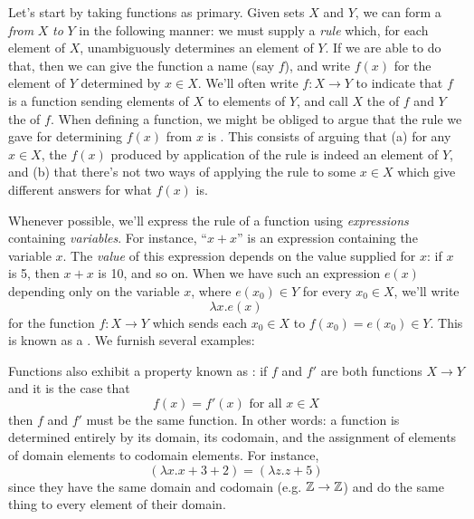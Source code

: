     Let's start by taking functions as primary. Given sets $X$ and $Y$, we can form a  \textit{from} $X$ \textit{to} $Y$ in the following manner: we must supply a \textit{rule} which, for each element of $X$, unambiguously determines an element of $Y$. If we are able to do that, then we can give the function a name (say $f$), and write $f(x)$ for the element of $Y$ determined by $x\in X$. We'll often write $f:X\to Y$ to indicate that $f$ is a function sending elements of $X$ to elements of $Y$, and call $X$ the  of $f$ and $Y$ the  of $f$. When defining a function, we might be obliged to argue that the rule we gave for determining $f(x)$ from $x$ is . This consists of arguing that (a) for any $x\in X$, the $f(x)$ produced by application of the rule is indeed an element of $Y$, and (b) that there's not two ways of applying the rule to some $x\in X$ which give different answers for what $f(x)$ is.

    Whenever possible, we'll express the rule of a function using \textit{expressions} containing \textit{variables}. For instance, ``$x+x$'' is an expression containing the variable $x$. The \textit{value} of this expression depends on the value supplied for $x$: if $x$ is 5, then $x+x$ is 10, and so on. When we have such an expression $e(x)$ depending only on the variable $x$, where $e(x_0)\in Y$ for every $x_0\in X$, we'll write
        \[ \lambda x.e(x) \]
    for the function $f:X\to Y$ which sends each $x_0\in X$ to $f(x_0)=e(x_0)\in Y$. This is known as a . We furnish several examples:
    

    Functions also exhibit a property known as : if $f$ and $f'$ are both functions $X\to Y$ and it is the case that
        \[ f(x)=f'(x)\text{ for all $x\in X$} \]
    then $f$ and $f'$ must be the same function. In other words: a function is determined entirely by its domain, its codomain, and the assignment of elements of domain elements to codomain elements. For instance,
        \[ (\lambda x.x+3+2) = (\lambda z.z+5) \]
    since they have the same domain and codomain (e.g. $\mathbb Z\to\mathbb Z$) and do the same thing to every element of their domain.

